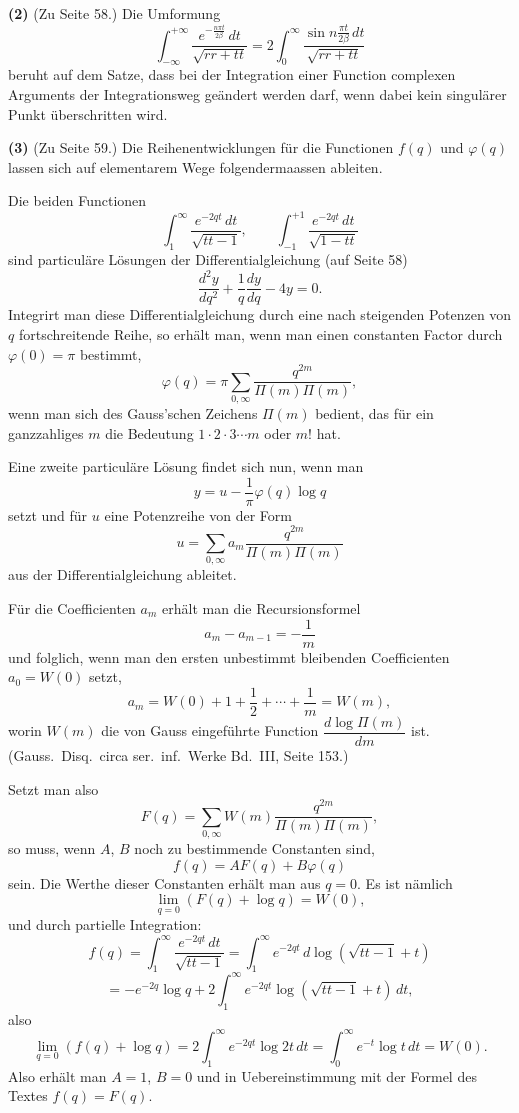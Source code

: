 \documentclass[12pt,a4paper]{book}
\theoremstyle{definition}
\theoremstyle{remark}
\begin{document}
\textbf{(2)} (Zu Seite 58.) Die Umformung
\[
\int_{-\infty}^{+\infty} \frac{e^{-\frac{n\pi t}{2\beta}}\, dt}{\sqrt{rr + tt}} = 2 \int_0^{\infty} \frac{\sin n\frac{\pi t}{2\beta}\, dt}{\sqrt{rr + tt}}
\]
beruht auf dem Satze, dass bei der Integration einer Function complexen Arguments der Integrationsweg geändert werden darf, wenn dabei kein singulärer Punkt überschritten wird.

\textbf{(3)} (Zu Seite 59.) Die Reihenentwicklungen für die Functionen $f(q)$ und $\varphi(q)$ lassen sich auf elementarem Wege folgendermaassen ableiten.

Die beiden Functionen
\[
\int_1^{\infty} \frac{e^{-2qt}\, dt}{\sqrt{tt-1}}, \qquad \int_{-1}^{+1} \frac{e^{-2qt}\, dt}{\sqrt{1-tt}}
\]
sind particuläre Lösungen der Differentialgleichung (auf Seite 58)
\[
\frac{d^2 y}{dq^2} + \frac{1}{q}\frac{dy}{dq} - 4y = 0.
\]
Integrirt man diese Differentialgleichung durch eine nach steigenden Potenzen von $q$ fortschreitende Reihe, so erhält man, wenn man einen constanten Factor durch $\varphi(0) = \pi$ bestimmt,
\[
\varphi(q) = \pi \sum_{0,\infty} \frac{q^{2m}}{\Pi(m)\Pi(m)},
\]
 wenn man sich des Gauss'schen Zeichens $\Pi(m)$ bedient, das für ein ganzzahliges $m$ die Bedeutung $1 \cdot 2 \cdot 3 \cdots m$ oder $m!$ hat.

Eine zweite particuläre Lösung findet sich nun, wenn man
\[
y = u - \frac{1}{\pi} \varphi(q) \log q
\]
setzt und für $u$ eine Potenzreihe von der Form
\[
u = \sum_{0,\infty} a_m \frac{q^{2m}}{\Pi(m)\Pi(m)}
\]
aus der Differentialgleichung ableitet.

Für die Coefficienten $a_m$ erhält man die Recursionsformel
\[
a_m - a_{m-1} = -\frac{1}{m}
\]
und folglich, wenn man den ersten unbestimmt bleibenden Coefficienten $a_0 = W(0)$ setzt,
\[
a_m = W(0) + 1 + \frac{1}{2} + \cdots + \frac{1}{m} = W(m),
\]
worin $W(m)$ die von Gauss eingeführte Function $\dfrac{d\log\Pi(m)}{dm}$ ist. (Gauss.\ Disq.\ circa ser.\ inf.\ Werke Bd.~III, Seite 153.)

Setzt man also
\[
F(q) = \sum_{0,\infty} W(m) \frac{q^{2m}}{\Pi(m)\Pi(m)},
\]
so muss, wenn $A$, $B$ noch zu bestimmende Constanten sind,
\[
f(q) = AF(q) + B\varphi(q)
\]
sein. Die Werthe dieser Constanten erhält man aus $q = 0$. Es ist nämlich
\[
\lim_{q=0} (F(q) + \log q) = W(0),
\]
und durch partielle Integration:
\[
f(q) = \int_1^{\infty} \frac{e^{-2qt}\, dt}{\sqrt{tt-1}} = \int_1^{\infty} e^{-2qt}\, d\log(\sqrt{tt-1} + t)
\]
\[
= -e^{-2q}\log q + 2\int_1^{\infty} e^{-2qt} \log(\sqrt{tt-1} + t)\, dt,
\]
also
\[
\lim_{q=0} (f(q) + \log q) = 2\int_1^{\infty} e^{-2qt} \log 2t\, dt = \int_0^{\infty} e^{-t} \log t\, dt = W(0).
\]
Also erhält man $A = 1$, $B = 0$ und in Uebereinstimmung mit der Formel des Textes $f(q) = F(q)$.
\end{document}
